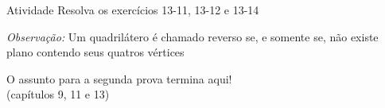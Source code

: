 
\begin{frame}{Atividade}
    Resolva os exercícios 13-11, 13-12 e 13-14

    \textit{Observação:} Um quadrilátero é chamado reverso se, e somente se, não existe plano contendo seus quatros vértices

    \vspace{4cm}
    \begin{center}
        \Large{O assunto para a segunda prova termina aqui! \\ (capítulos 9, 11 e 13)}
    \end{center}
\end{frame}
